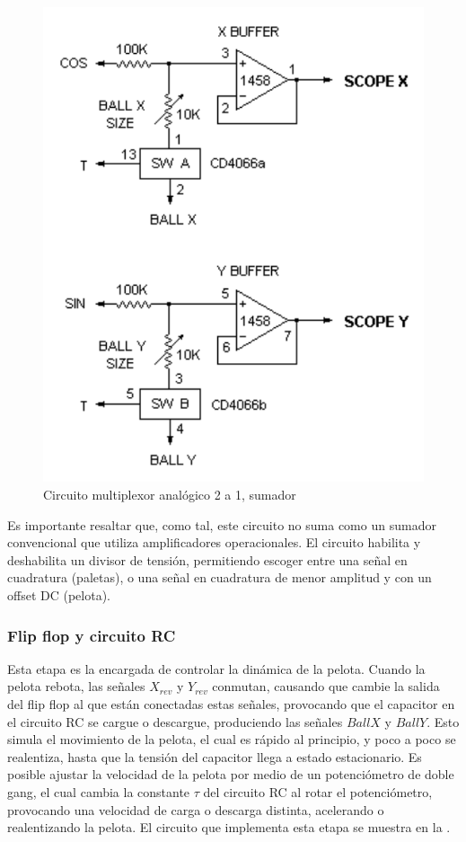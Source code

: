 \begin{figure}[H]
    \centering
    \includegraphics[width=0.5\linewidth]{figs/descripcion/multiplexor.png}
    \caption{Circuito multiplexor analógico 2 a 1, sumador \cite{pong}}
    \label{mux}
\end{figure}

Es importante resaltar que, como tal, este circuito no suma como un sumador convencional que utiliza amplificadores operacionales.
El circuito habilita y deshabilita un divisor de tensión, permitiendo escoger entre una señal en cuadratura (paletas), o una señal en cuadratura de menor amplitud y con un offset DC (pelota).

\subsubsection{Flip flop y circuito RC}
Esta etapa es la encargada de controlar la dinámica de la pelota. 
Cuando la pelota rebota, las señales $X_{rev}$ y $Y_{rev}$ conmutan, causando que cambie la salida del flip flop al que están conectadas estas señales, provocando que el capacitor en el circuito RC se cargue o descargue, produciendo las señales $BallX$ y $BallY$.
Esto simula el movimiento de la pelota, el cual es rápido al principio, y poco a poco se realentiza, hasta que la tensión del capacitor llega a estado estacionario. 
Es posible ajustar la velocidad de la pelota por medio de un potenciómetro de doble gang, el cual cambia la constante $\tau$ del circuito RC al rotar el potenciómetro, provocando una velocidad de carga o descarga distinta, acelerando o realentizando la pelota.
El circuito que implementa esta etapa se muestra en la .

